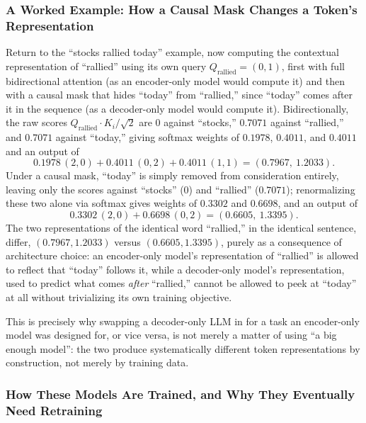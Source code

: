 \documentclass[../ai_in_finance]{subfiles}
\begin{document}
\subsubsection*{A Worked Example: How a Causal Mask Changes a Token's Representation}
Return to the ``stocks rallied today'' example, now computing the contextual representation of ``rallied'' using its own query $Q_{\text{rallied}} = (0,1)$, first with full bidirectional attention (as an encoder-only model would compute it) and then with a causal mask that hides ``today'' from ``rallied,'' since ``today'' comes after it in the sequence (as a decoder-only model would compute it). Bidirectionally, the raw scores $Q_{\text{rallied}} \cdot K_i/\sqrt{2}$ are $0$ against ``stocks,'' $0.7071$ against ``rallied,'' and $0.7071$ against ``today,'' giving softmax weights of $0.1978$, $0.4011$, and $0.4011$ and an output of
\begin{equation*}
0.1978\,(2,0) + 0.4011\,(0,2) + 0.4011\,(1,1) = (0.7967,\ 1.2033).
\end{equation*}
Under a causal mask, ``today'' is simply removed from consideration entirely, leaving only the scores against ``stocks'' ($0$) and ``rallied'' ($0.7071$); renormalizing these two alone via softmax gives weights of $0.3302$ and $0.6698$, and an output of
\begin{equation*}
0.3302\,(2,0) + 0.6698\,(0,2) = (0.6605,\ 1.3395).
\end{equation*}
The two representations of the identical word ``rallied,'' in the identical sentence, differ, $(0.7967, 1.2033)$ versus $(0.6605, 1.3395)$, purely as a consequence of architecture choice: an encoder-only model's representation of ``rallied'' is allowed to reflect that ``today'' follows it, while a decoder-only model's representation, used to predict what comes \emph{after} ``rallied,'' cannot be allowed to peek at ``today'' at all without trivializing its own training objective.

This is precisely why swapping a decoder-only LLM in for a task an encoder-only model was designed for, or vice versa, is not merely a matter of using ``a big enough model'': the two produce systematically different token representations by construction, not merely by training data.

\subsubsection*{How These Models Are Trained, and Why They Eventually Need Retraining}
\end{document}
